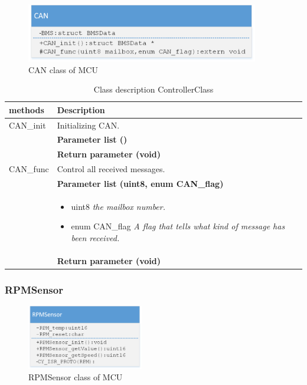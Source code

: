 \begin{figure}[H]
	\centering
	\includegraphics [width=4in]{Software/Pictures/class-diagram-CAN.png}
	\caption{CAN class of MCU}
	\label{fig:Class_diagram_MCU_CAN}
\end{figure}

\begin{table}[H]
	\centering
	\begin{tabular}{|p{5 cm}|p{10 cm}|}
		\hline
		\textbf{methods} & \textbf{Description} \\ \hline
		
		CAN\_init
		& Initializing CAN. 
		\\ & \textbf{Parameter list ()}
		\\ & \textbf{Return parameter (void)}
		\\ \hline
		
		CAN\_func
		& Control all received messages.
		\\ & \textbf{Parameter list (uint8, enum CAN\_flag)}
		\\ & \begin{itemize}
			\item {\large uint8}
			\subitem \textit{the mailbox number.}
			\item {\large enum CAN\_flag}
			\subitem \textit{A flag that tells what kind of message has been received.}
		\end{itemize}
		\\ & \textbf{Return parameter (void)}
		\\ \hline
		
		
	\end{tabular}
	\caption{Class description ControllerClass}
	\label{table:Class_description_CAN_MCU}
\end{table}

\subsubsection{RPMSensor}

\begin{figure}[H]
	\centering
	\includegraphics [width=2in]{Software/Pictures/class-diagram-RPMSensor.png}
	\caption{RPMSensor class of MCU}
	\label{fig:Class_diagram_MCU_RPMSensor}
\end{figure}

